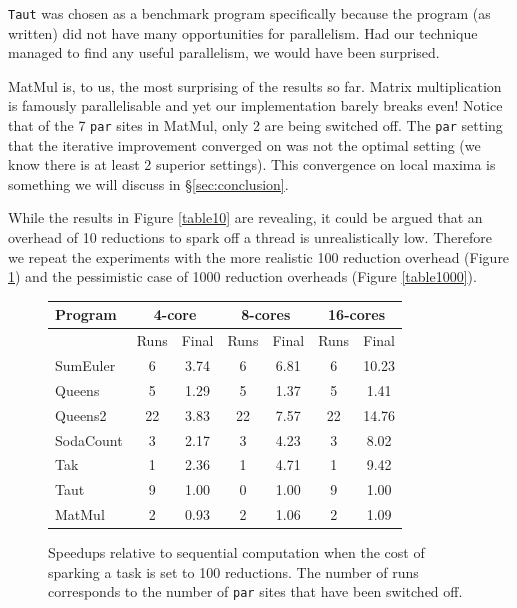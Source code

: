 \texttt{Taut} was chosen as a benchmark program specifically because the program (as
written) did not have many opportunities for parallelism. Had our technique
managed to find any useful parallelism, we would have been surprised.

MatMul is, to us, the most surprising of the results so far. Matrix
multiplication is famously parallelisable and yet our implementation
barely breaks even! Notice that of the 7 \verb-par- sites in MatMul, only
2 are being switched off. The \verb-par- setting that the iterative
improvement converged on was not the optimal setting (we know there is at least
2 superior settings). This convergence on local maxima is something we will
discuss in \S\ref{sec:conclusion}.

While the results in Figure \ref{table10} are revealing, it could be argued that
an overhead of 10 reductions to spark off a thread is unrealistically low.
Therefore we repeat the experiments with the more realistic 100 reduction
overhead (Figure \ref{table100}) and the pessimistic case of 1000 reduction
overheads (Figure \ref{table1000}).

\begin{figure}[ht]
\centering
  \begin{tabular}{ |l||c c|c c|c c| }
    \hline
    Program & \multicolumn{2}{c|}{4-core} & \multicolumn{2}{c|}{8-cores} & \multicolumn{2}{c|}{16-cores} \\
    \hline
            & Runs & Final     & Runs & Final      & Runs & Final \\
    \hline
    SumEuler  & 6    & 3.74      & 6    & 6.81       & 6    & 10.23     \\
    Queens    & 5    & 1.29      & 5    & 1.37       & 5    & 1.41  \\
    Queens2   & 22   & 3.83      & 22   & 7.57       & 22   & 14.76  \\
    SodaCount & 3    & 2.17      & 3    & 4.23       & 3    & 8.02    \\
    Tak       & 1    & 2.36      & 1    & 4.71       & 1    & 9.42   \\
    Taut      & 9    & 1.00      & 0    & 1.00       & 9    & 1.00  \\
    MatMul    & 2    & 0.93      & 2    & 1.06       & 2    & 1.09   \\
    \hline
  \end{tabular}
\caption{Speedups relative to sequential computation when the cost of sparking
        a task is set to 100 reductions. The number of runs corresponds to the
        number of \texttt{par} sites that have been switched off.}
\label{table100}
\end{figure}

